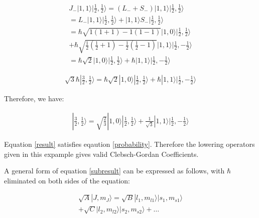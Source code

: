 \documentclass[12pt,journal,compsoc]{IEEEtran}
\begin{document}
\begin{equation}
\begin{aligned}
J_{-} |1,1\rangle |\frac{1}{2},\frac{1}{2}\rangle = (L_{-}+ S_{-}) |1,1\rangle |\frac{1}{2},\frac{1}{2}\rangle \\= L_{-}|1,1\rangle |\frac{1}{2},\frac{1}{2}\rangle + |1,1\rangle S_{-} |\frac{1}{2},\frac{1}{2}\rangle \\= \hbar\sqrt{1(1+1)-1(1-1)} |1,0\rangle |\frac{1}{2},\frac{1}{2}\rangle\\ + \hbar \sqrt{\frac{1}{2} \left( \frac{1}{2}+1 \right) -  \frac{1}{2} \left( \frac{1}{2}-1 \right)} |1,1\rangle |\frac{1}{2},-\frac{1}{2}\rangle\\ = \hbar \sqrt{2} |1,0\rangle |\frac{1}{2},\frac{1}{2}\rangle + \hbar |1,1\rangle |\frac{1}{2},-\frac{1}{2}\rangle
\end{aligned}
\end{equation}

\begin{equation}
\begin{aligned}
\sqrt{3} \hbar |\frac{3}{2},\frac{1}{2}\rangle = \hbar \sqrt{2} |1,0\rangle |\frac{1}{2},\frac{1}{2}\rangle + \hbar |1,1\rangle |\frac{1}{2},-\frac{1}{2}\rangle
\end{aligned}
\label{subresult}
\end{equation}

Therefore, we have:

\begin{equation}
\begin{aligned}
|\frac{3}{2},\frac{1}{2}\rangle = \sqrt{\frac{2}{3}} |1,0\rangle |\frac{1}{2},\frac{1}{2}\rangle + \frac{1}{\sqrt{3}} |1,1\rangle |\frac{1}{2},-\frac{1}{2}\rangle
\end{aligned}
\label{result}
\end{equation}

Equation \ref{result} satisfies eqaution \ref{probability}. Therefore the lowering operators given in this expample gives valid Clebsch-Gordan Coefficients.

A general form of equation \ref{subresult} can be expressed as follows, with $\hbar$ eliminated on both sides of the equation:

\begin{equation}
\begin{aligned}
\sqrt{A} |J,m_J\rangle = \sqrt{B}|l_1,m_{l1}\rangle|s_1,m_{s1}\rangle \\+ \sqrt{C}|l_2,m_{l2}\rangle|s_2,m_{s2}\rangle+ \ldots
\end{aligned}
\label{main-model}
\end{equation}
\end{document}
